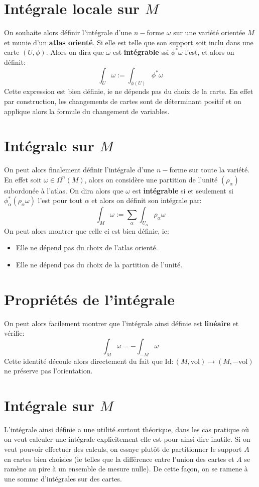 \section{Intégrale locale sur \( M \)}
On souhaite alors définir l'intégrale d'une \( n-\)forme \(\omega\) sur une variété orientée \( M \) et munie d'un \textbf{atlas orienté}. Si elle est telle que son support soit inclu dans une carte \( (U, \phi) \). Alors on dira que \( \omega \) est \textbf{intégrable} ssi \( \phi^*\omega \) l'est, et alors on définit:
\[ 
   \int_U \omega := \int_{ \phi(U)} \phi^*\omega 
\]
Cette expression est bien définie, ie ne dépends pas du choix de la carte. En effet par construction, les changements de cartes sont de déterminant positif et on applique alors la formule du changement de variables.
\section{Intégrale sur \( M \)}
On peut alors finalement définir l'intégrale d'une \( n-\)forme sur toute la variété. En effet soit \( \omega \in \Omega^n(M) \), alors on considère une partition de l'unité \( (\rho_\alpha) \) subordonée à l'atlas. On dira alors que \( \omega \) est \textbf{intégrable} si et seulement si \( \phi_\alpha^*(\rho_\alpha \omega)  \) l'est pour tout \( \alpha \) et alors on définit son intégrale par:
\[ 
   \int_M \omega := \sum_\alpha \int_{U_\alpha} \rho_\alpha \omega 
\]
On peut alors montrer que celle ci est bien définie, ie:
\begin{itemize}
   \item Elle ne dépend pas du choix de l'atlas orienté.
   \item Elle ne dépend pas du choix de la partition de l'unité.
\end{itemize}
\section{Propriétés de l'intégrale}
On peut alors facilement montrer que l'intégrale ainsi définie est \textbf{linéaire} et vérifie:
\[ 
   \int_M \omega = - \int_{-M} \omega 
\]
Cette identité découle alors directement du fait que \( \text{Id}: (M, \text{vol}) \longrightarrow (M, -\text{vol}) \) ne préserve pas l'orientation.
\section{Intégrale sur \( M \)}
L'intégrale ainsi définie a une utilité surtout théorique, dans les cas pratique où on veut calculer une intégrale explicitement elle est pour ainsi dire inutile. Si on veut pouvoir effectuer des calculs, on essaye plutôt de partitionner le support \(  A \) en cartes bien choisies (ie telles que la différence entre l'union des cartes et \( A \) se ramène au pire à un ensemble de mesure nulle). De cette façon, on se ramene à une somme d'intégrales sur des cartes. 
